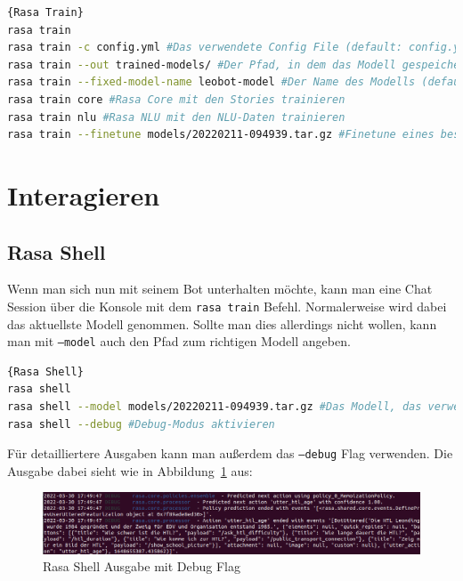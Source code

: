 \begin{lstlisting}[language=bash,label={lst:rasa-train},caption={Rasa Train Befehle}]{Rasa Train}
rasa train
rasa train -c config.yml #Das verwendete Config File (default: config.yml)
rasa train --out trained-models/ #Der Pfad, in dem das Modell gespeichert wird (default: models/)
rasa train --fixed-model-name leobot-model #Der Name des Modells (default: <timestamp>.tar.gz)
rasa train core #Rasa Core mit den Stories trainieren
rasa train nlu #Rasa NLU mit den NLU-Daten trainieren
rasa train --finetune models/20220211-094939.tar.gz #Finetune eines bestehenden Modells
\end{lstlisting}


\section{Interagieren}

\subsection{Rasa Shell}

Wenn man sich nun mit seinem Bot unterhalten möchte, kann man eine Chat Session über die Konsole mit dem \texttt{rasa train} Befehl.
Normalerweise wird dabei das aktuellste Modell genommen.
Sollte man dies allerdings nicht wollen, kann man mit \texttt{--model} auch den Pfad zum richtigen Modell angeben.

\begin{lstlisting}[language=bash,label={lst:shell-command},caption={Rasa Shell Befehle}]{Rasa Shell}
rasa shell
rasa shell --model models/20220211-094939.tar.gz #Das Modell, das verwendet werden soll
rasa shell --debug #Debug-Modus aktivieren
\end{lstlisting}

Für detailliertere Ausgaben kann man außerdem das \texttt{--debug} Flag verwenden.
Die Ausgabe dabei sieht wie in Abbildung~\ref{fig:rasa_shell} aus:

\begin{figure}[hbt!]
    \centering
    \includegraphics[scale=0.40]{pics/rasa_shell}
    \caption{Rasa Shell Ausgabe mit Debug Flag}
    \label{fig:rasa_shell}
\end{figure}

